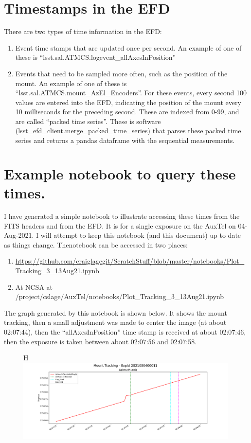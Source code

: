 \documentclass[SE,authoryear,toc]{lsstdoc}
\begin{document}
\section{Timestamps in the EFD}

There are two types of time information in the EFD:
\begin{enumerate}
  \item Event time stamps that are updated once per second.  An example of one of these is ``lsst.sal.ATMCS.logevent\_allAxesInPosition''
  \item Events that need to be sampled more often, such as the position of the mount.  An example of one of these is ``lsst.sal.ATMCS.mount\_AzEl\_Encoders''.  For these events, every second 100 values are entered into the EFD, indicating the position of the mount every 10 milliseconds for the preceding second.  These are indexed from 0-99, and are called ``packed time series''.  These is software (lsst\_efd\_client.merge\_packed\_time\_series) that parses these packed time series and returns a pandas dataframe with the sequential measurements.
\end{enumerate}

\section{Example notebook to query these times.}

I have generated a simple notebook to illustrate accessing these times from the FITS headers and from the EFD.  It is for a single exposure on the AuxTel on 04-Aug-2021.  I will attempt to keep this notebook (and this document) up to date as things change.  Thenotebook can be accessed in two places:
\begin{enumerate}
  \item \url{https://github.com/craiglagegit/ScratchStuff/blob/master/notebooks/Plot_Tracking_3_13Aug21.ipynb}
  \item At NCSA at /project/cslage/AuxTel/notebooks/Plot\_Tracking\_3\_13Aug21.ipynb
\end{enumerate}

The graph generated by this notebook is shown below.  It shows the mount tracking, then a small adjustment was made to center the image (at about 02:07:44), then the ``allAxesInPosition'' time stamp is received at about 02:07:46, then the exposure is taken between about 02:07:56 and 02:07:58.

  \begin {figure} {H}
    \centering
    \includegraphics[trim=0.0in 0.0in 0.0in 0.0in,clip,width=0.99\textwidth]{Tracking_Timebase_2021080400011_13Aug21.pdf}
  \end{figure}
\end{document}
